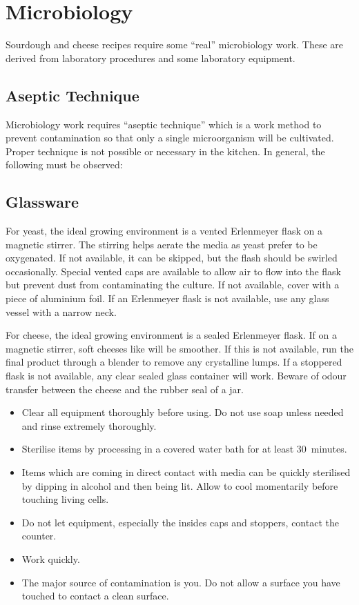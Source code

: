 \chapter{Microbiology}
Sourdough and cheese recipes require some ``real'' microbiology work. These are derived from laboratory procedures and some laboratory equipment.
\begin{multicols}{2}\raggedcolumns
\section{Aseptic Technique}
Microbiology work requires ``aseptic technique'' which is a work method to prevent contamination so that only a single microorganism will be cultivated. Proper technique is not possible or necessary in the kitchen. In general, the following must be observed:
\section{Glassware}

For yeast, the ideal growing environment is a vented Erlenmeyer flask on a magnetic stirrer. The stirring helps aerate the media as yeast prefer to be oxygenated. If not available, it can be skipped, but the flash should be swirled occasionally. Special vented caps are available to allow air to flow into the flask but prevent dust from contaminating the culture. If not available, cover with a piece of aluminium foil. If an Erlenmeyer flask is not available, use any glass vessel with a narrow neck.

For cheese, the ideal growing environment is a sealed Erlenmeyer flask. If on a magnetic stirrer, soft cheeses like  will be smoother. If this is not available, run the final product through a blender to remove any crystalline lumps. If a stoppered flask is not available, any clear sealed glass container will work. Beware of odour transfer between the cheese and the rubber seal of a jar.

\begin{itemize}
\item Clear all equipment thoroughly before using. Do not use soap unless needed and rinse extremely thoroughly.
\item Sterilise items by processing in a covered water bath for at least 30~minutes.
\item Items which are coming in direct contact with media can be quickly sterilised by dipping in alcohol and then being lit. Allow to cool momentarily before touching living cells.
\item Do not let equipment, especially the insides caps and stoppers, contact the counter.
\item Work quickly.
\item The major source of contamination is you. Do not allow a surface you have touched to contact a clean surface.
\end{itemize}

\end{multicols}

